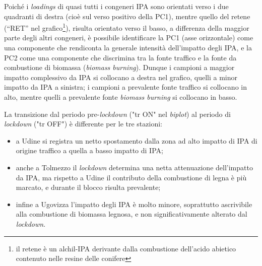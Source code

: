 Poiché i \textit{loadings} di quasi tutti i congeneri IPA sono orientati verso i due quadranti di destra (cioè sul verso positivo della PC1), mentre quello del retene (“RET” nel grafico\footnote{il retene è un alchil-IPA derivante dalla combustione dell’acido abietico contenuto nelle resine delle conifere}), risulta orientato verso il basso, a differenza della maggior parte degli altri congeneri, è possibile identificare la PC1 (asse orizzontale) come una componente che rendiconta la generale intensità dell’impatto degli IPA, e la PC2 come una componente che discrimina tra la fonte traffico e la fonte da combustione di biomassa (\textit{biomass burning}). 
Dunque i campioni a maggior impatto complessivo da IPA si collocano a destra nel grafico, quelli a minor impatto da IPA a sinistra; i campioni a prevalente fonte traffico si collocano in alto, mentre quelli a prevalente fonte \textit{biomass burning} si collocano in basso.

La transizione dal periodo pre-\textit{lockdown} ("tr ON" nel \textit{biplot}) al periodo di \textit{lockdown} ("tr OFF") è differente per le tre stazioni: 
\begin{itemize}
    \item a Udine si registra un netto spostamento dalla zona ad alto impatto di IPA di origine traffico a quella a basso impatto di IPA; 
    \item anche a Tolmezzo il \textit{lockdown} determina una netta attenuazione dell'impatto da IPA, ma rispetto a Udine il contributo della combustione di legna è più marcato, e durante il blocco risulta prevalente;
    \item infine a Ugovizza l'impatto degli IPA è molto minore, soprattutto ascrivibile alla combustione di biomassa legnosa, e non significativamente alterato dal \textit{lockdown}.
\end{itemize}

